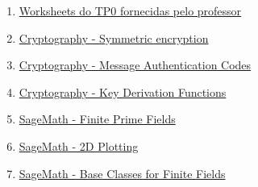 \documentclass[11pt]{article}
\providecommand{\tightlist}{%
      \setlength{\itemsep}{0pt}\setlength{\parskip}{0pt}}
\begin{document}
    \begin{enumerate}
\def\labelenumi{\arabic{enumi}.}
\tightlist
\item
  \href{https://www.dropbox.com/sh/f0j9adiaw4v3deb/AACBpI2YqgkN5iuVEas5P8wVa/WorkSheets/TP0?dl=0\&subfolder_nav_tracking=1}{Worksheets
  do TP0 fornecidas pelo professor}
\item
  \href{https://cryptography.io/en/latest/hazmat/primitives/symmetric-encryption/}{Cryptography
  - Symmetric encryption}
\item
  \href{https://cryptography.io/en/latest/hazmat/primitives/mac/}{Cryptography
  - Message Authentication Codes}
\item
  \href{https://cryptography.io/en/latest/hazmat/primitives/key-derivation-functions/}{Cryptography
  - Key Derivation Functions}
\item
  \href{http://doc.sagemath.org/html/en/reference/finite_rings/sage/rings/finite_rings/finite_field_prime_modn.html}{SageMath
  - Finite Prime Fields}
\item
  \href{http://doc.sagemath.org/html/en/reference/plotting/sage/plot/plot.html}{SageMath
  - 2D Plotting}
\item
  \href{http://doc.sagemath.org/html/en/reference/finite_rings/sage/rings/finite_rings/finite_field_base.html}{SageMath
  - Base Classes for Finite Fields}
\end{enumerate}


    
    
    
    
\end{document}
